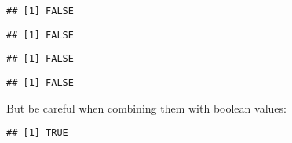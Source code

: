 \begin{verbatim}
## [1] FALSE
\end{verbatim}

\begin{Shaded}
\begin{Highlighting}[]
\NormalTok{(}\NormalTok{)}
\end{Highlighting}
\end{Shaded}

\begin{verbatim}
## [1] FALSE
\end{verbatim}

\begin{Shaded}
\begin{Highlighting}[]
\NormalTok{(}\NormalTok{)}
\end{Highlighting}
\end{Shaded}

\begin{verbatim}
## [1] FALSE
\end{verbatim}

\begin{Shaded}
\begin{Highlighting}[]
\NormalTok{(}\NormalTok{)}
\end{Highlighting}
\end{Shaded}

\begin{verbatim}
## [1] FALSE
\end{verbatim}

But be careful when combining them with boolean values:

\begin{Shaded}
\begin{Highlighting}[]
\NormalTok{(}\NormalTok{)}
\end{Highlighting}
\end{Shaded}

\begin{verbatim}
## [1] TRUE
\end{verbatim}

\begin{Shaded}
\begin{Highlighting}[]
\NormalTok{(}\NormalTok{)}
\end{Highlighting}
\end{Shaded}

